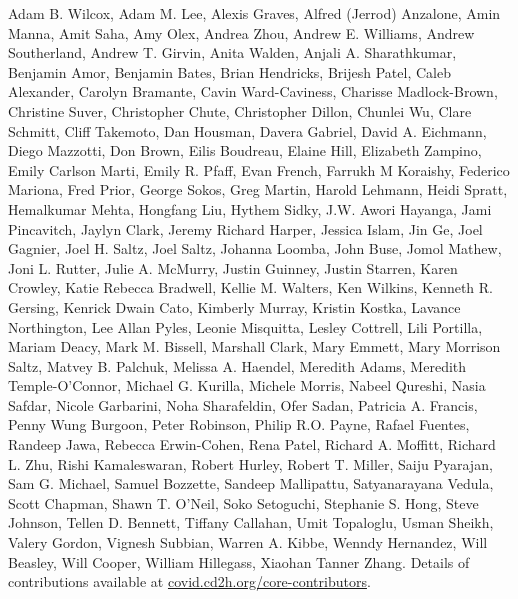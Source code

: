 \documentclass[11pt]{article}
\theoremstyle{plain}
\theoremstyle{definition}
\theoremstyle{remark}
\newcommand{\0}{\mathbf{0}}
\begin{document}
Adam B. Wilcox, Adam M. Lee, Alexis Graves, Alfred (Jerrod) Anzalone, Amin Manna, Amit Saha, Amy Olex, Andrea Zhou, Andrew E. Williams, Andrew Southerland, Andrew T. Girvin, Anita Walden, Anjali A. Sharathkumar, Benjamin Amor, Benjamin Bates, Brian Hendricks, Brijesh Patel, Caleb Alexander, Carolyn Bramante, Cavin Ward-Caviness, Charisse Madlock-Brown, Christine Suver, Christopher Chute, Christopher Dillon, Chunlei Wu, Clare Schmitt, Cliff Takemoto, Dan Housman, Davera Gabriel, David A. Eichmann, Diego Mazzotti, Don Brown, Eilis Boudreau, Elaine Hill, Elizabeth Zampino, Emily Carlson Marti, Emily R. Pfaff, Evan French, Farrukh M Koraishy, Federico Mariona, Fred Prior, George Sokos, Greg Martin, Harold Lehmann, Heidi Spratt, Hemalkumar Mehta, Hongfang Liu, Hythem Sidky, J.W. Awori Hayanga, Jami Pincavitch, Jaylyn Clark, Jeremy Richard Harper, Jessica Islam, Jin Ge, Joel Gagnier, Joel H. Saltz, Joel Saltz, Johanna Loomba, John Buse, Jomol Mathew, Joni L. Rutter, Julie A. McMurry, Justin Guinney, Justin Starren, Karen Crowley, Katie Rebecca Bradwell, Kellie M. Walters, Ken Wilkins, Kenneth R. Gersing, Kenrick Dwain Cato, Kimberly Murray, Kristin Kostka, Lavance Northington, Lee Allan Pyles, Leonie Misquitta, Lesley Cottrell, Lili Portilla, Mariam Deacy, Mark M. Bissell, Marshall Clark, Mary Emmett, Mary Morrison Saltz, Matvey B. Palchuk, Melissa A. Haendel, Meredith Adams, Meredith Temple-O'Connor, Michael G. Kurilla, Michele Morris, Nabeel Qureshi, Nasia Safdar, Nicole Garbarini, Noha Sharafeldin, Ofer Sadan, Patricia A. Francis, Penny Wung Burgoon, Peter Robinson, Philip R.O. Payne, Rafael Fuentes, Randeep Jawa, Rebecca Erwin-Cohen, Rena Patel, Richard A. Moffitt, Richard L. Zhu, Rishi Kamaleswaran, Robert Hurley, Robert T. Miller, Saiju Pyarajan, Sam G. Michael, Samuel Bozzette, Sandeep Mallipattu, Satyanarayana Vedula, Scott Chapman, Shawn T. O'Neil, Soko Setoguchi, Stephanie S. Hong, Steve Johnson, Tellen D. Bennett, Tiffany Callahan, Umit Topaloglu, Usman Sheikh, Valery Gordon, Vignesh Subbian, Warren A. Kibbe, Wenndy Hernandez, Will Beasley, Will Cooper, William Hillegass, Xiaohan Tanner Zhang. Details of contributions available at \url{covid.cd2h.org/core-contributors}.






\newpage
\appendix
\onecolumn
\end{document}
